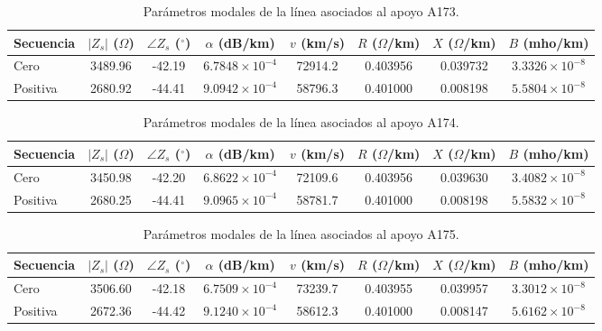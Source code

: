 \documentclass[12pt,letterpaper]{article}
\begin{document}
\begin{table}[H]
\centering
\caption{Parámetros modales de la línea asociados al apoyo A173.}
\label{tab:lcc_a173}
\renewcommand{\arraystretch}{1.2}
\begin{tabular}{lccccccc}
\toprule
Secuencia &
$\left|Z_s\right|$ ($\Omega$) &
$\angle Z_s$ ($^\circ$) &
$\alpha$ (dB/km) &
$v$ (km/s) &
$R$ ($\Omega$/km) &
$X$ ($\Omega$/km) &
$B$ (mho/km) \\
\midrule
Cero     & 3489.96 & -42.19 & $6.7848\times10^{-4}$ & 72914.2 & 0.403956 & 0.039732 & $3.3326\times10^{-8}$ \\
Positiva & 2680.92 & -44.41 & $9.0942\times10^{-4}$ & 58796.3 & 0.401000 & 0.008198 & $5.5804\times10^{-8}$ \\
\bottomrule
\end{tabular}
\end{table}

\begin{table}[H]
\centering
\caption{Parámetros modales de la línea asociados al apoyo A174.}
\label{tab:lcc_a174}
\renewcommand{\arraystretch}{1.2}
\begin{tabular}{lccccccc}
\toprule
Secuencia &
$\left|Z_s\right|$ ($\Omega$) &
$\angle Z_s$ ($^\circ$) &
$\alpha$ (dB/km) &
$v$ (km/s) &
$R$ ($\Omega$/km) &
$X$ ($\Omega$/km) &
$B$ (mho/km) \\
\midrule
Cero     & 3450.98 & -42.20 & $6.8622\times10^{-4}$ & 72109.6 & 0.403956 & 0.039630 & $3.4082\times10^{-8}$ \\
Positiva & 2680.25 & -44.41 & $9.0965\times10^{-4}$ & 58781.7 & 0.401000 & 0.008198 & $5.5832\times10^{-8}$ \\
\bottomrule
\end{tabular}
\end{table}

\begin{table}[H]
\centering
\caption{Parámetros modales de la línea asociados al apoyo A175.}
\label{tab:lcc_a175}
\renewcommand{\arraystretch}{1.2}
\begin{tabular}{lccccccc}
\toprule
Secuencia &
$\left|Z_s\right|$ ($\Omega$) &
$\angle Z_s$ ($^\circ$) &
$\alpha$ (dB/km) &
$v$ (km/s) &
$R$ ($\Omega$/km) &
$X$ ($\Omega$/km) &
$B$ (mho/km) \\
\midrule
Cero     & 3506.60 & -42.18 & $6.7509\times10^{-4}$ & 73239.7 & 0.403955 & 0.039957 & $3.3012\times10^{-8}$ \\
Positiva & 2672.36 & -44.42 & $9.1240\times10^{-4}$ & 58612.3 & 0.401000 & 0.008147 & $5.6162\times10^{-8}$ \\
\bottomrule
\end{tabular}
\end{table}
\end{document}
